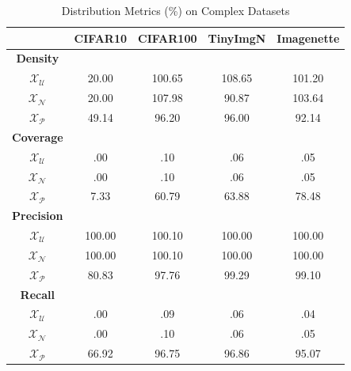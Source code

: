 \begin{table}[ht]
    \caption{Distribution Metrics (\%) on Complex Datasets}
    \label{tab:abla-embeddings-coverage-objects}
    \centering
    \begin{tabular}{c|c|c|c|c}
        \hline  & CIFAR10 & CIFAR100 & TinyImgN & Imagenette \\
        \hline \textbf{Density} & & & & \\
        $\mathcal{X}_\mathcal{U}$ & \phantom{0}20.00 &           100.65 &           108.65 &           101.20 \\
        $\mathcal{X}_\mathcal{N}$ & \phantom{0}20.00 &           107.98 & \phantom{0}90.87 &           103.64 \\
        $\mathcal{X}_\mathcal{P}$ & \phantom{0}49.14 & \phantom{0}96.20 & \phantom{0}96.00 & \phantom{0}92.14 \\
        \hline \textbf{Coverage} & & & & \\
        $\mathcal{X}_\mathcal{U}$ & \phantom{000}.00 & \phantom{000}.10 & \phantom{000}.06 & \phantom{000}.05 \\
        $\mathcal{X}_\mathcal{N}$ & \phantom{000}.00 & \phantom{000}.10 & \phantom{000}.06 & \phantom{000}.05 \\
        $\mathcal{X}_\mathcal{P}$ & \phantom{00}7.33 & \phantom{0}60.79 & \phantom{0}63.88 & \phantom{0}78.48 \\
        \hline \textbf{Precision} & & & & \\
        $\mathcal{X}_\mathcal{U}$ &           100.00 &           100.10 &           100.00 &           100.00 \\
        $\mathcal{X}_\mathcal{N}$ &           100.00 &           100.10 &           100.00 &           100.00 \\
        $\mathcal{X}_\mathcal{P}$ & \phantom{0}80.83 & \phantom{0}97.76 & \phantom{0}99.29 & \phantom{0}99.10 \\
        \hline \textbf{Recall} & & & & \\
        $\mathcal{X}_\mathcal{U}$ & \phantom{000}.00 & \phantom{000}.09 & \phantom{000}.06 & \phantom{000}.04 \\
        $\mathcal{X}_\mathcal{N}$ & \phantom{000}.00 & \phantom{000}.10 & \phantom{000}.06 & \phantom{000}.05 \\
        $\mathcal{X}_\mathcal{P}$ & \phantom{0}66.92 & \phantom{0}96.75 & \phantom{0}96.86 & \phantom{0}95.07 \\
        \hline
    \end{tabular}
\end{table}

